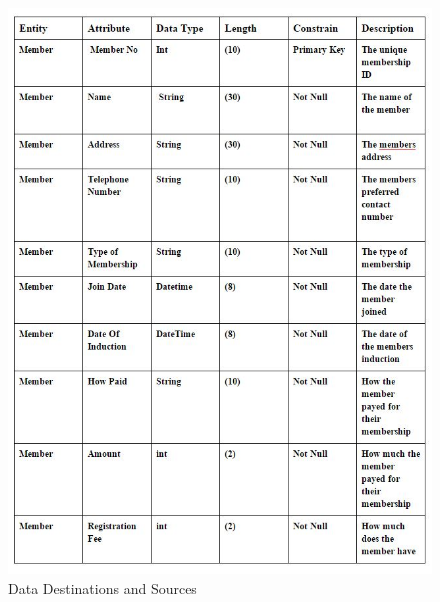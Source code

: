 \begin{figure}[H]
    \includegraphics[width=\textwidth]{DataDictionaryProposed.JPG}
    \caption{Data Destinations and Sources} \label{fig: Data Destinations and Sources }
\end{figure}


